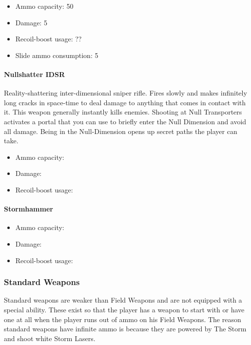 \documentclass[12pt]{article}
\begin{document}
\begin{itemize}
	\item Ammo capacity: 50
	\item Damage: 5
	\item Recoil-boost usage: ??
	\item Slide ammo consumption: 5
\end{itemize} 


\paragraph{Nullshatter IDSR}

Reality-shattering inter-dimensional sniper rifle. Fires slowly and makes infinitely long cracks in space-time to deal damage to anything that comes in contact with it. This weapon generally instantly kills enemies. Shooting at Null Transporters activates a portal that you can use to briefly enter the Null Dimension and avoid all damage. Being in the Null-Dimension opens up secret paths the player can take.

\begin{itemize}
	\item Ammo capacity: 
	\item Damage: 
	\item Recoil-boost usage:
\end{itemize}

\paragraph{Stormhammer}

\begin{itemize}
	\item Ammo capacity: 
	\item Damage: 
	\item Recoil-boost usage:
\end{itemize}

\subsubsection{Standard Weapons}

Standard weapons are weaker than Field Weapons and are not equipped with a special ability. These exist so that the player has a weapon to start with or have one at all when the player runs out of ammo on his Field Weapons. The reason standard weapons have infinite ammo is because they are powered by The Storm and shoot white Storm Lasers. 
\end{document}
